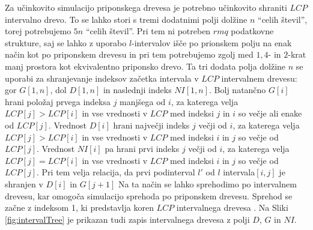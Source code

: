 Za učinkovito simulacijo priponskega drevesa je potrebno učinkovito shraniti $LCP$ intervalno drevo. To se lahko stori s tremi dodatnimi polji dolžine $n$ \enquote{celih števil}, torej potrebujemo $5n$ \enquote{celih števil}. Pri tem ni potreben $rmq$ podatkovne strukture, saj se lahko z uporabo $l$-intervalov išče po prionskem polju na enak način kot po priponskem drevesu in pri tem potrebujemo zgolj med $1,4$- in $2$-krat manj prostora kot ekvivalentno priponsko drevo. Ta tri dodata polja dolžine $n$ se uporabi za shranjevanje indeksov začetka intervala v $LCP$ intervalnem drevesu: gor $G[1,n]$, dol $D[1,n]$ in naslednji indeks $NI[1,n]$. Bolj natančno $G[i]$ hrani položaj prvega indeksa $j$ manjšega od $i$, za katerega velja $LCP[j]>LCP[i]$ in vse vrednosti v $LCP$ med indeksi $j$ in $i$ so večje ali enake od $LCP[j]$. Vrednost $D[i]$ hrani največji indeks $j$ večji od $i$, za katerega velja $LCP[j]>LCP[i]$ in vse vrednosti v $LCP$ med indeksi $i$ in $j$ so večje od $LCP[j]$. Vrednost $NI[i]$ pa hrani prvi indeks $j$ večji od $i$, za katerega velja $LCP[j]=LCP[i]$ in vse vrednosti v $LCP$ med indeksi $i$ in $j$ so večje od $LCP[j]$. Pri tem velja relacija, da prvi podinterval $l'$ od $l$ intervala$[i,j]$ je shranjen v $D[i]$ in $G[j+1]$ Na ta način se lahko sprehodimo po intervalnem drevesu, kar omogoča simulacijo sprehoda po priponskem drevesu. Sprehod se začne z indeksom 1, ki predstavlja koren $LCP$ intervalnega drevesa \cite{Abouelhoda2004}. Na Sliki \ref{fig:intervalTree} je prikazan tudi zapis intervalnega drevesa z polji $D$, $G$ in $NI$. 

